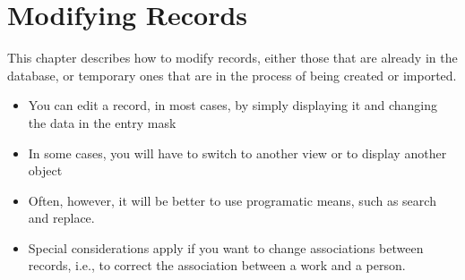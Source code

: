 
\chapter{Modifying Records}
\label{cha:umodify}

This chapter describes how to modify records, either those that are
already in the database, or temporary ones that are in the process of
being created or imported.

\begin{itemize}
\item You can edit a record, in most cases, by simply displaying it
  and changing the data in the entry mask
\item In some cases, you will have to switch to another view or
  to display another object
\item Often, however, it will be better to use programatic means, such
  as search and replace. 
\item Special considerations apply if you want to change associations
  between records, i.e., to correct the association between a work and
  a person.
\end{itemize}





